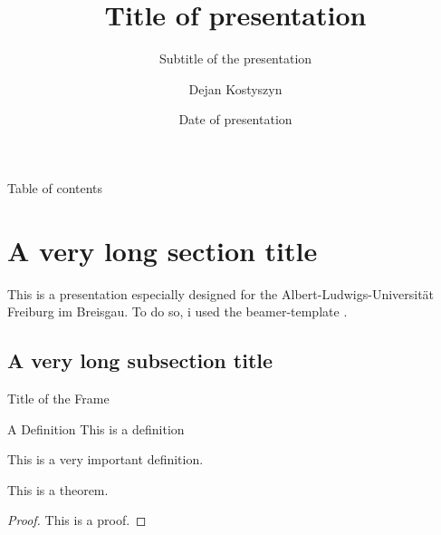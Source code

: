 


\author[Kostyszyn]{Dejan Kostyszyn}
\date{Date of presentation}
\title{Title of presentation}
\subtitle{Subtitle of the presentation}


\begin{frame}
	\titlepage
\end{frame}

\begin{frame}{Table of contents}
\tableofcontents[sectionstyle=show/show]
\end{frame}

\section[Short sec title]{A very long section title}
\begin{frame}
	This is a presentation especially designed for the Albert-Ludwigs-Universität Freiburg im Breisgau. To do so, i used the beamer-template \cite{ctan_beamer}.
\end{frame}

\subsection[Short subsec title]{A very long subsection title}
\begin{frame}{Title of the Frame}
	\begin{definition}{A Definition} This is a definition \end{definition}
	\begin{definition} This is a \alert{very important} definition. \end{definition}
    \begin{theorem} This is a theorem. \end{theorem}
    \begin{proof} This is a proof. \end{proof}
\end{frame}


